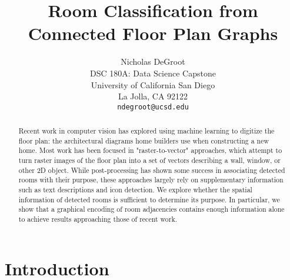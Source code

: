\documentclass{article}
\title{Room Classification from Connected Floor Plan Graphs}
\author{
Nicholas DeGroot \\
DSC 180A: Data Science Capstone \\
University of California San Diego\\
La Jolla, CA 92122 \\
\texttt{ndegroot@ucsd.edu}
}
\begin{document}
\maketitle

\begin{abstract}

Recent work in computer vision has explored using machine learning to digitize the floor plan: the architectural diagrams home builders use when constructing a new home. Most work has been focused in "raster-to-vector" approaches, which attempt to turn raster images of the floor plan into a set of vectors describing a wall, window, or other 2D object. While post-processing has shown some success in associating detected rooms with their purpose, these approaches largely rely on supplementary information such as text descriptions and icon detection. We explore whether the spatial information of detected rooms is sufficient to determine its purpose. In particular, we show that a graphical encoding of room adjacencies contains enough information alone to achieve results approaching those of recent work.

\end{abstract}

\section{Introduction}


\end{document}

